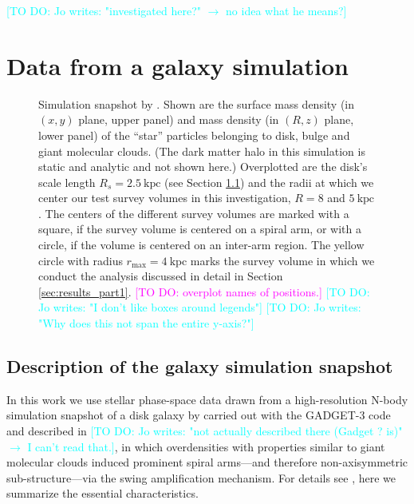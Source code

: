 \documentclass[iop,revtex4,numberedappendix,appendixfloats]{emulateapj}
\newcommand{\Wilma}[1]{\textcolor{Magenta}{#1}}
\newcommand{\Jo}[1]{\textcolor{Cyan}{#1}}
\begin{document}
\Jo{[TO DO: Jo writes: "investigated here?" $\longrightarrow$ no idea what he means?]}


\section{Data from a galaxy simulation} \label{sec:simulation}

\begin{figure}[!htbp]
\caption{Simulation snapshot by \citet{2013ApJ...766...34D}. Shown are the surface mass density (in $(x,y)$ plane, upper panel) and mass density (in $(R,z)$ plane, lower panel) of the ``star'' particles belonging to disk, bulge and giant molecular clouds. (The dark matter halo in this simulation is static and analytic and not shown here.) Overplotted are the disk's scale length $R_s=2.5~\text{kpc}$ (see Section \ref{sec:simulation_description}) and the radii at which we center our test survey volumes in this investigation, $R=8$ and $5~\text{kpc}$. The centers of the different survey volumes are marked with a square, if the survey volume is centered on a spiral arm, or with a circle, if the volume is centered on an inter-arm region. The yellow circle with radius $r_\text{max}=4~\text{kpc}$ marks the survey volume in which we conduct the analysis discussed in detail in Section \ref{sec:results_part1}. \Wilma{[TO DO: overplot names of positions.]} \Jo{[TO DO: Jo writes: "I don't like boxes around legends"]} \Jo{[TO DO: Jo writes: "Why does this not span the entire y-axis?"]}}
\label{fig:simulation}
\end{figure}

\subsection{Description of the galaxy simulation snapshot} \label{sec:simulation_description}

In this work we use stellar phase-space data drawn from a high-resolution N-body simulation snapshot of a disk galaxy by \citet{2013ApJ...766...34D} carried out with the GADGET-3 code and described in \citet{2005MNRAS.361..776S} \Jo{[TO DO: Jo writes: "not actually described there (Gadget ? is)" $\longrightarrow$ I can't read that.]}, in which overdensities with properties similar to giant molecular clouds induced prominent spiral arms---and therefore non-axisymmetric sub-structure---via the swing amplification mechanism. For details see \citet{2013ApJ...766...34D}, here we summarize the essential characteristics.
\end{document}

